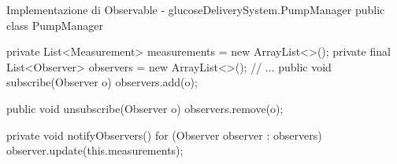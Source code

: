 \begin{javaCode}{Implementazione di Observable - glucoseDeliverySystem.PumpManager}
public class PumpManager {
    private List<Measurement> measurements = new ArrayList<>();
    private final List<Observer> observers = new ArrayList<>();
    // ...
    public void subscribe(Observer o) { observers.add(o); }
    
    public void unsubscribe(Observer o) { observers.remove(o); }
    
    private void notifyObservers() {
        for (Observer observer : observers) {
            observer.update(this.measurements);
        }
    }
}
\end{javaCode}